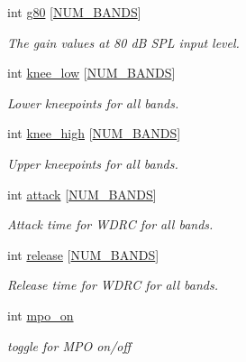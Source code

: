 \begin{DoxyCompactItemize}
int \mbox{\hyperlink{structosp__user__data__t_a02d70968d64180808d46e4f76e066382}{g80}} \mbox{[}\mbox{\hyperlink{constants_8h_a19441d7b9be72492ed93a440085e53be}{N\+U\+M\+\_\+\+B\+A\+N\+DS}}\mbox{]}
\begin{DoxyCompactList}\small\item\em The gain values at 80 dB S\+PL input level. \end{DoxyCompactList}\item 
int \mbox{\hyperlink{structosp__user__data__t_a8709446147e7d44c5b9cfabe9e51799e}{knee\+\_\+low}} \mbox{[}\mbox{\hyperlink{constants_8h_a19441d7b9be72492ed93a440085e53be}{N\+U\+M\+\_\+\+B\+A\+N\+DS}}\mbox{]}
\begin{DoxyCompactList}\small\item\em Lower kneepoints for all bands. \end{DoxyCompactList}\item 
int \mbox{\hyperlink{structosp__user__data__t_a2564a1c5458026ce4a1532458886f5ab}{knee\+\_\+high}} \mbox{[}\mbox{\hyperlink{constants_8h_a19441d7b9be72492ed93a440085e53be}{N\+U\+M\+\_\+\+B\+A\+N\+DS}}\mbox{]}
\begin{DoxyCompactList}\small\item\em Upper kneepoints for all bands. \end{DoxyCompactList}\item 
int \mbox{\hyperlink{structosp__user__data__t_abb30fbb6fa960d660b72e18ecd82ee88}{attack}} \mbox{[}\mbox{\hyperlink{constants_8h_a19441d7b9be72492ed93a440085e53be}{N\+U\+M\+\_\+\+B\+A\+N\+DS}}\mbox{]}
\begin{DoxyCompactList}\small\item\em Attack time for W\+D\+RC for all bands. \end{DoxyCompactList}\item 
int \mbox{\hyperlink{structosp__user__data__t_ab1e8e99c42b77ee9f8920b678d94a1a5}{release}} \mbox{[}\mbox{\hyperlink{constants_8h_a19441d7b9be72492ed93a440085e53be}{N\+U\+M\+\_\+\+B\+A\+N\+DS}}\mbox{]}
\begin{DoxyCompactList}\small\item\em Release time for W\+D\+RC for all bands. \end{DoxyCompactList}\item 
int \mbox{\hyperlink{structosp__user__data__t_af265bd9d66e58eec5ac0b43a2f8e02cc}{mpo\+\_\+on}}
\begin{DoxyCompactList}\small\item\em toggle for M\+PO on/off \end{DoxyCompactList}\item 

\end{DoxyCompactItemize}
